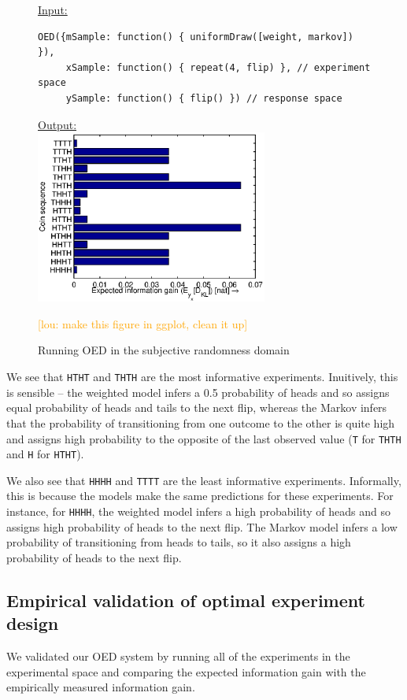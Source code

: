 \documentclass{article}
\newcommand{\lou}[1]{\textcolor{orange}{[lou: #1]}}
\begin{document}
\begin{figure}[h!]
\underline{\textsf{Input:}}
\begin{lstlisting}
OED({mSample: function() { uniformDraw([weight, markov]) }),
     xSample: function() { repeat(4, flip) }, // experiment space
     ySample: function() { flip() }) // response space
\end{lstlisting}

\underline{\textsf{Output:}}\\
\includegraphics[width=3in]{img/coin.eps}
\caption{Running OED in the subjective randomness domain}
\lou{make this figure in ggplot, clean it up}
\label{fig:run-coin}
\end{figure}

We see that \lstinline{HTHT} and \lstinline{THTH} are the most informative experiments.
Inuitively, this is sensible -- the weighted model infers a 0.5 probability of heads and so assigns equal probability of heads and tails to the next flip, whereas the Markov infers that the probability of transitioning from one outcome to the other is quite high and assigns high probability to the opposite of the last observed value (\lstinline{T} for \lstinline{THTH} and \lstinline{H} for \lstinline{HTHT}).

We also see that \lstinline{HHHH} and \lstinline{TTTT} are the least informative experiments.
Informally, this is because the models make the same predictions for these experiments.
For instance, for \lstinline{HHHH}, the weighted model infers a high probability of heads and so assigns high probability of heads to the next flip.
The Markov model infers a low probability of transitioning from heads to tails, so it also assigns a high probability of heads to the next flip.

\subsection{Empirical validation of optimal experiment design}
We validated our OED system by running all of the experiments in the experimental space and comparing the expected information gain with the empirically measured information gain.
\end{document}
